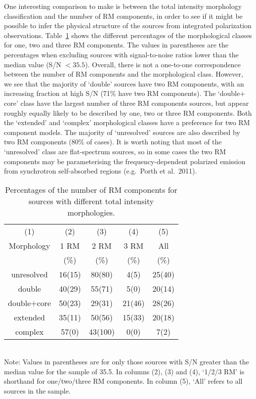 \documentclass{mnras}
\begin{document}
One interesting comparison to make is between the total intensity morphology classification and the number of RM components, in order to see if it might be possible to infer the physical structure of the sources from integrated polarization observations. Table~\ref{cmpntsmorph} shows the different percentages of the morphological classes for one, two and three RM components. The values in parentheses are the percentages when excluding sources with signal-to-noise ratios lower than the median value (S/N $< 35.5$). 
Overall, there is not a one-to-one correspondence between the number of RM components and the morphological class. 
However, we see that the majority of `double' sources have two RM components, with an increasing fraction at high S/N (71\% have two RM components). 
The `double$+$core' class have the largest number of three RM components sources, but appear roughly equally likely to be described by one, two or three RM components. Both the `extended' and `complex' morphological classes have a preference for two RM component models. 
The majority of `unresolved' sources are also described by two RM components (80\% of cases). It is worth noting that most of the `unresolved' class are flat-spectrum sources, so in some cases the two RM components may be parameterising the frequency-dependent polarized emission from synchrotron self-absorbed regions (e.g.~Porth et al.~2011). 

\begin{table}%
 \caption{Percentages of the number of RM components for sources with different total intensity morphologies.}
 \centering
   \begin{tabular}{ccccc}
    \hline\hline
       (1) & (2) & (3) & (4) & (5)  \\
      Morphology   & 1 RM & 2 RM &  3 RM    & All        \\
                           & (\%)   &  (\%)  &    (\%) &  (\%)                \\
      \hline            
unresolved          & 16(15)  & 80(80) & 4(5)       &  25(40) \\
double                & 40(29) & 55(71) & 5(0)       &  20(14) \\
double$+$core   & 50(23) & 29(31) & 21(46)   &  28(26) \\
extended            & 35(11) & 50(56) & 15(33)   &  20(18) \\
complex             & 57(0)  & 43(100) & 0(0)       &  7(2) \\
      \hline
   \end{tabular}\\
\scriptsize{Note: Values in parentheses are for only those sources with S/N greater than the median value for the sample of 35.5. 
In columns (2), (3) and (4), `1/2/3 RM' is shorthand for one/two/three RM components. In column (5), `All' refers to all sources in the sample. }
\label{cmpntsmorph}
\end{table}
\end{document}
